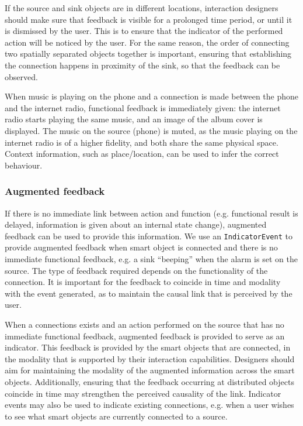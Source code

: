 If the source and sink objects are in different locations, interaction designers should make sure that feedback is visible for a prolonged time period, or until it is dismissed by the user. This is to ensure that the indicator of the performed action will be noticed by the user. For the same reason, the order of connecting two spatially separated objects together is important, ensuring that establishing the connection happens in proximity of the sink, so that the feedback can be observed. 

\begin{example}
When music is playing on the phone and a connection is made between the phone and the internet radio, functional feedback is immediately given: the internet radio starts playing the same music, and an image of the album cover is displayed. The music on the source (phone) is muted, as the music playing on the internet radio is of a higher fidelity, and both share the same physical space. Context information, such as place/location, can be used to infer the correct behaviour.
\end{example}

\subsubsection{Augmented feedback} 
If there is no immediate link between action and function  (e.g. functional result is delayed, information is given about an internal state change), augmented feedback can be used to provide this information. We use an \texttt{IndicatorEvent} to provide augmented feedback when smart object is connected and there is no immediate functional feedback, e.g. a sink ``beeping'' when the alarm is set on the source.  The type of feedback required depends on the functionality of the connection. It is important for the feedback to coincide in time and modality with the event generated, as to maintain the causal link that is perceived by the user.

When a connections exists and an action performed on the source that has no immediate functional feedback, augmented feedback is provided to serve as an indicator. This feedback is  provided by the smart objects that are connected, in the modality that is supported by their interaction capabilities. Designers should aim for maintaining the modality of the augmented information across the smart objects. Additionally, ensuring that the feedback occurring at distributed objects coincide in time may strengthen the perceived causality of the link. Indicator events may also be used to indicate existing connections, e.g. when a user wishes to see what smart objects are currently connected to a source.  

